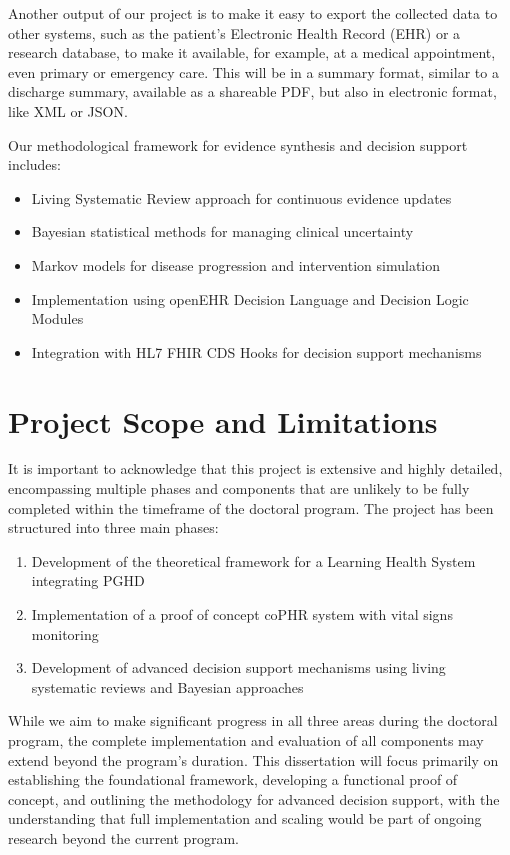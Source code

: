 Another output of our project is to make it easy to export the collected data to other systems, such as the patient's Electronic Health Record (EHR) or a research database, to make it available, for example, at a medical appointment, even primary or emergency care. This will be in a summary format, similar to a discharge summary, available as a shareable PDF, but also in electronic format, like XML or JSON.

Our methodological framework for evidence synthesis and decision support includes:

\begin{itemize}
\item Living Systematic Review approach for continuous evidence updates
\item Bayesian statistical methods for managing clinical uncertainty
\item Markov models for disease progression and intervention simulation
\item Implementation using openEHR Decision Language and Decision Logic Modules
\item Integration with HL7 FHIR CDS Hooks for decision support mechanisms
\end{itemize}

\section{Project Scope and Limitations} \label{sec:scope}

It is important to acknowledge that this project is extensive and highly detailed, encompassing multiple phases and components that are unlikely to be fully completed within the timeframe of the doctoral program. The project has been structured into three main phases:

\begin{enumerate}
\item Development of the theoretical framework for a Learning Health System integrating PGHD
\item Implementation of a proof of concept coPHR system with vital signs monitoring
\item Development of advanced decision support mechanisms using living systematic reviews and Bayesian approaches
\end{enumerate}

While we aim to make significant progress in all three areas during the doctoral program, the complete implementation and evaluation of all components may extend beyond the program's duration. This dissertation will focus primarily on establishing the foundational framework, developing a functional proof of concept, and outlining the methodology for advanced decision support, with the understanding that full implementation and scaling would be part of ongoing research beyond the current program.

